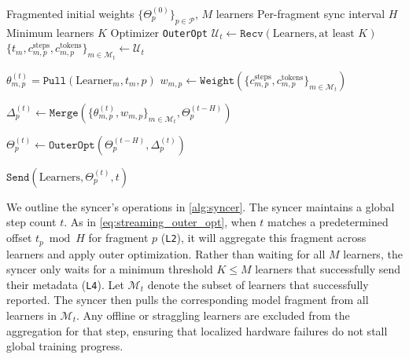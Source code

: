 \documentclass[11pt, a4paper, twocolumn, copyright, google]{google}
\newcommand{\mergefn}{\texttt{Merge}\xspace}
\begin{document}
\begin{algorithm}[t!] \small
\caption{Decoupled DiLoCo: Syncer} \label{alg:syncer}
\begin{algorithmic}[1]
\Require Fragmented initial weights $\{\Theta_p^{(0)}\}_{p \in \mathcal{P}}$, $M$ learners
\Require Per-fragment sync interval $H$
\Require Minimum learners $K$
\Require Optimizer \texttt{OuterOpt}
    \Statex
    \State {}
    \State $ \mathcal{U}_t \gets \texttt{Recv}(\text{Learners}, \text{at least } K) $
    \State $ \{ t_m, c^{\text{steps}}_{m,p}, c^{\text{tokens}}_{m,p} \}_{m \in \mathcal{M}_t} \gets \mathcal{U}_{t} $
    
        \State $\theta^{(t)}_{m,p}=\texttt{Pull}(\text{Learner}_m, t_m, p)$
        \Statex
    \EndFor
    \State $w_{m,p} \gets \texttt{Weight}(\{c^{\text{steps}}_{m,p}, c^{\text{tokens}}_{m,p}\}_{m \in \mathcal{M}_t}) $

    \Statex
    \State {}
    \State $\Delta_p^{(t)} \gets \mergefn\left(\{\theta_{m,p}^{(t)}, w_{m,p}\}_{m \in \mathcal{M}_{t}}, \Theta_{p}^{(t-H)}\right)$

    \Statex
    \State {}
    \State $\Theta_p^{(t)} \gets \texttt{OuterOpt}(\Theta_p^{(t-H)}, \Delta_p^{(t)})$

    \Statex
    \State {}
    \State $\texttt{Send}(\text{Learners}, \Theta_p^{(t)}, t)$
    \EndIf
\EndFor
\end{algorithmic}
\end{algorithm}

We outline the syncer's operations in \autoref{alg:syncer}. The syncer maintains a global step count $t$. As in \eqref{eq:streaming_outer_opt}, when $t$ matches a predetermined offset $t_p \bmod H$ for fragment $p$ (\texttt{L2}), it will aggregate this fragment across learners and apply outer optimization. Rather than waiting for all $M$ learners, the syncer only waits for a minimum threshold $K \le M$ learners that successfully send their metadata (\texttt{L4}). Let $\mathcal{M}_t$ denote the subset of learners that successfully reported. The syncer then pulls the corresponding model fragment from all learners in $\mathcal{M}_t$. Any offline or straggling learners are excluded from the aggregation for that step, ensuring that localized hardware failures do not stall global training progress.
\end{document}
